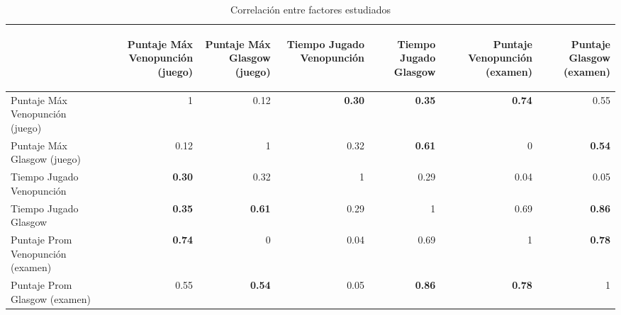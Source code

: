 \begin{table}[H]
\centering

\begin{tabular}{lrrrrrr}
\toprule
        &
\begin{sideways}\textbf{Puntaje Máx Venopunción (juego)}\end{sideways}  &
\begin{sideways}\textbf{Puntaje Máx Glasgow (juego)}\end{sideways}        &
\begin{sideways}\textbf{Tiempo Jugado Venopunción}\end{sideways}         &
\begin{sideways}\textbf{Tiempo Jugado Glasgow}\end{sideways} &
\begin{sideways}\textbf{Puntaje Venopunción (examen)}\end{sideways}  &
\begin{sideways}\textbf{Puntaje Glasgow (examen)}\end{sideways}    \\
\midrule
Puntaje Máx Venopunción (juego)   & 1             & 0.12          & \textbf{0.30} & \textbf{0.35} & \textbf{0.74} & 0.55 \\
Puntaje Máx Glasgow (juego)       & 0.12          & 1             & 0.32          & \textbf{0.61} & 0             & \textbf{0.54}\\
Tiempo Jugado Venopunción         & \textbf{0.30} & 0.32          & 1             & 0.29          & 0.04          & 0.05\\
Tiempo Jugado Glasgow             & \textbf{0.35} & \textbf{0.61} & 0.29          & 1             & 0.69          & \textbf{0.86}\\
Puntaje Prom Venopunción (examen) & \textbf{0.74} & 0             & 0.04          & 0.69          & 1             & \textbf{0.78} \\
Puntaje Prom Glasgow (examen)     & 0.55          & \textbf{0.54} & 0.05          & \textbf{0.86} & \textbf{0.78} & 1 \\
\bottomrule               
\end{tabular}
\caption{Correlación entre factores estudiados} 
\label{tab:all_correlation}
\end{table}
